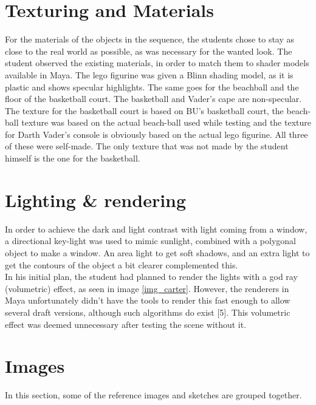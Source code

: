 \documentclass[12pt,a4paper]{article}
\begin{document}
\section{Texturing and Materials}
For the materials of the objects in the sequence, the students chose to stay as close to the real world as possible, as was necessary for the wanted look. The student observed the existing materials, in order to match them to shader models available in Maya. The lego figurine was given a Blinn shading model, as it is plastic and shows specular highlights. The same goes for the beachball and the floor of the basketball court. The basketball and Vader's cape are non-specular.\\

The texture for the basketball court is based on BU's basketball court, the beach-ball texture was based on the actual beach-ball used while testing and the texture for Darth Vader's console is obviously based on the actual lego figurine. All three of these were self-made. The only texture that was not made by the student himself is the one for the basketball.\\

\section{Lighting \& rendering}
In order to achieve the dark and light contrast with light coming from a window, a directional key-light was used to mimic sunlight, combined with a polygonal object to make a window. An area light to get soft shadows, and an extra light to get the contours of the object a bit clearer complemented this. \\

In his initial plan, the student had planned to render the lights with a god ray (volumetric) effect, as seen in image \ref{img_carter}. However, the renderers in Maya unfortunately didn't have the tools to render this fast enough to allow several draft versions, although such algorithms do exist [5]. This volumetric effect was deemed unnecessary after testing the scene without it.

\section{Images}
In this section, some of the reference images and sketches are grouped together.
\end{document}

